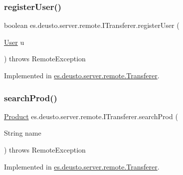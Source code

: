 \subsubsection{\texorpdfstring{register\+User()}{registerUser()}}
{\footnotesize\ttfamily boolean es.\+deusto.\+server.\+remote.\+I\+Transferer.\+register\+User (\begin{DoxyParamCaption}\item[{\hyperlink{classes_1_1deusto_1_1server_1_1db_1_1data_1_1_user}{User}}]{u }\end{DoxyParamCaption}) throws Remote\+Exception}



Implemented in \hyperlink{classes_1_1deusto_1_1server_1_1remote_1_1_transferer_a80e2dd7db595bdd8d39969e5d0e8ae7b}{es.\+deusto.\+server.\+remote.\+Transferer}.

\mbox{\label{interfacees_1_1deusto_1_1server_1_1remote_1_1_i_transferer_a1fb33a5447e1647ffde8a01d180b8d99}} 
\subsubsection{\texorpdfstring{search\+Prod()}{searchProd()}}
{\footnotesize\ttfamily \hyperlink{classes_1_1deusto_1_1server_1_1db_1_1data_1_1_product}{Product} es.\+deusto.\+server.\+remote.\+I\+Transferer.\+search\+Prod (\begin{DoxyParamCaption}\item[{String}]{name }\end{DoxyParamCaption}) throws Remote\+Exception}



Implemented in \hyperlink{classes_1_1deusto_1_1server_1_1remote_1_1_transferer_ad6759f696eddd682b750f92ec41d1fcb}{es.\+deusto.\+server.\+remote.\+Transferer}.

\mbox{\label{interfacees_1_1deusto_1_1server_1_1remote_1_1_i_transferer_ab43399cfce0d84f6e27032a7c14865f6}} 
